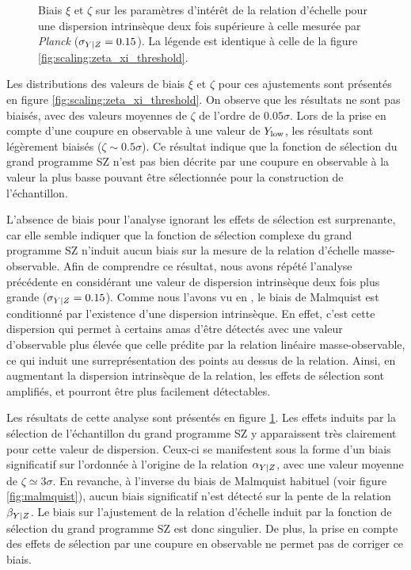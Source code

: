 \begin{figure}[t]
    \caption{
        Biais $\xi$ et $\zeta$ sur les paramètres d'intérêt de la relation d'échelle pour une dispersion intrinsèque deux fois supérieure à celle mesurée par \textit{Planck} ($\sigma_{Y|Z} = 0.15$).
        La légende est identique à celle de la figure \ref{fig:scaling:zeta_xi_threshold}.
    }
    \label{fig:scaling:zeta_xi_threshold_2}
\end{figure}

Les distributions des valeurs de biais $\xi$ et $\zeta$ pour ces ajustements sont présentés en figure \ref{fig:scaling:zeta_xi_threshold}.
On observe que les résultats ne sont pas biaisés, avec des valeurs moyennes de $\zeta$ de l'ordre de $0.05\sigma$.
Lors de la prise en compte d'une coupure en observable à une valeur de $Y_{\rm low}$, les résultats sont légèrement biaisés ($\zeta \sim 0.5\sigma$).
Ce résultat indique que la fonction de sélection du grand programme SZ n'est pas bien décrite par une coupure en observable à la valeur la plus basse pouvant être sélectionnée pour la construction de l'échantillon.

L'absence de biais pour l'analyse ignorant les effets de sélection est surprenante, car elle semble indiquer que la fonction de sélection complexe du grand programme SZ n'induit aucun biais sur la mesure de la relation d'échelle masse-observable.
Afin de comprendre ce résultat, nous avons répété l'analyse précédente en considérant une valeur de dispersion intrinsèque deux fois plus grande ($\sigma_{Y|Z} = 0.15$).
Comme nous l'avons vu en , le biais de Malmquist est conditionné par l'existence d'une dispersion intrinsèque.
En effet, c'est cette dispersion qui permet à certains amas d'être détectés avec une valeur d'observable plus élevée que celle prédite par la relation linéaire masse-observable, ce qui induit une surreprésentation des points au dessus de la relation.
Ainsi, en augmentant la dispersion intrinsèque de la relation, les effets de sélection sont amplifiés, et pourront être plus facilement détectables.

Les résultats de cette analyse sont présentés en figure \ref{fig:scaling:zeta_xi_threshold_2}.
Les effets induits par la sélection de l'échantillon du grand programme SZ y apparaissent très clairement pour cette valeur de dispersion.
Ceux-ci se manifestent sous la forme d'un biais significatif sur l'ordonnée à l'origine de la relation $\alpha_{Y|Z}$, avec une valeur moyenne de $\zeta \simeq 3\sigma$.
En revanche, à l'inverse du biais de Malmquist habituel (voir figure \ref{fig:malmquist}), aucun biais significatif n'est détecté sur la pente de la relation $\beta_{Y|Z}$.
Le biais sur l'ajustement de la relation d'échelle induit par la fonction de sélection du grand programme SZ est donc singulier.
De plus, la prise en compte des effets de sélection par une coupure en observable ne permet pas de corriger ce biais.

